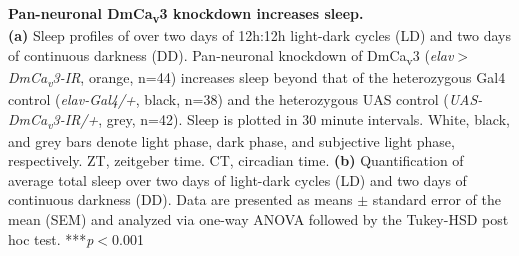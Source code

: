 \label{fig:5}
\textbf{Pan-neuronal DmCa\textsubscript{v}3 knockdown increases sleep.}
\\
\textbf{(a)} Sleep profiles of over two days of 12h:12h light-dark cycles (LD) and two days of continuous darkness (DD). Pan-neuronal knockdown of DmCa\textsubscript{v}3 (\emph{elav$>$DmCa\textsubscript{v}3-IR}, orange, n=44) increases sleep beyond that of the heterozygous Gal4 control (\emph{elav-Gal4/+}, black, n=38) and the heterozygous UAS control (\emph{UAS-DmCa\textsubscript{v}3-IR/+}, grey, n=42).
Sleep is plotted in 30 minute intervals.
White, black, and grey bars denote light phase, dark phase, and subjective light phase, respectively.
ZT, zeitgeber time.
CT, circadian time.
\textbf{(b)} Quantification of average total sleep over two days of light-dark cycles (LD) and two days of continuous darkness (DD).
Data are presented as means $\pm$ standard error of the mean (SEM) and analyzed via one-way ANOVA followed by the Tukey-HSD post hoc test.
***\emph{p}$<$0.001
